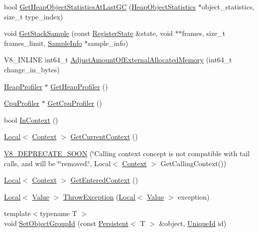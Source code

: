 \begin{DoxyCompactItemize}
\item 
bool \hyperlink{classv8_1_1_isolate_a677681d4c3abfc1bc2e8b50c23623e24}{Get\+Heap\+Object\+Statistics\+At\+Last\+GC} (\hyperlink{classv8_1_1_heap_object_statistics}{Heap\+Object\+Statistics} $\ast$object\+\_\+statistics, size\+\_\+t type\+\_\+index)
\item 
void \hyperlink{classv8_1_1_isolate_a8b173b48a477267ccd6c7d17c492b82e}{Get\+Stack\+Sample} (const \hyperlink{structv8_1_1_register_state}{Register\+State} \&state, void $\ast$$\ast$frames, size\+\_\+t frames\+\_\+limit, \hyperlink{structv8_1_1_sample_info}{Sample\+Info} $\ast$sample\+\_\+info)
\item 
V8\+\_\+\+I\+N\+L\+I\+NE int64\+\_\+t \hyperlink{classv8_1_1_isolate_aaeda5fa60961a3d9d476c46200e30711}{Adjust\+Amount\+Of\+External\+Allocated\+Memory} (int64\+\_\+t change\+\_\+in\+\_\+bytes)
\item 
\hyperlink{classv8_1_1_heap_profiler}{Heap\+Profiler} $\ast$ \hyperlink{classv8_1_1_isolate_a12f5bdacd2d2f62b1f5a22429a470ebb}{Get\+Heap\+Profiler} ()
\item 
\hyperlink{classv8_1_1_cpu_profiler}{Cpu\+Profiler} $\ast$ \hyperlink{classv8_1_1_isolate_a2e6874236fd37561b2263e011b1a714e}{Get\+Cpu\+Profiler} ()
\item 
bool \hyperlink{classv8_1_1_isolate_afb6bbd31a87d0999dbbe5402447690a9}{In\+Context} ()
\item 
\hyperlink{classv8_1_1_local}{Local}$<$ \hyperlink{classv8_1_1_context}{Context} $>$ \hyperlink{classv8_1_1_isolate_af68803b1b9fb0bf76107f56a7a762fac}{Get\+Current\+Context} ()
\item 
\hyperlink{classv8_1_1_isolate_adf1b08359e4162ee05caab23377dbc9d}{V8\+\_\+\+D\+E\+P\+R\+E\+C\+A\+T\+E\+\_\+\+S\+O\+ON} (\char`\"{}Calling context concept is not compatible with tail calls, and will be \char`\"{}\char`\"{}removed.\char`\"{}, Local$<$ \hyperlink{classv8_1_1_context}{Context} $>$ Get\+Calling\+Context())
\item 
\hyperlink{classv8_1_1_local}{Local}$<$ \hyperlink{classv8_1_1_context}{Context} $>$ \hyperlink{classv8_1_1_isolate_a05849e1b944a40051e063f799c79864c}{Get\+Entered\+Context} ()
\item 
\hyperlink{classv8_1_1_local}{Local}$<$ \hyperlink{classv8_1_1_value}{Value} $>$ \hyperlink{classv8_1_1_isolate_ad2d4dd42267c374a37b93df403ef11ac}{Throw\+Exception} (\hyperlink{classv8_1_1_local}{Local}$<$ \hyperlink{classv8_1_1_value}{Value} $>$ exception)
\item 
{\footnotesize template$<$typename T $>$ }\\void \hyperlink{classv8_1_1_isolate_ae4418cb238686a321aa406e90c72fab5}{Set\+Object\+Group\+Id} (const \hyperlink{classv8_1_1_persistent}{Persistent}$<$ T $>$ \&object, \hyperlink{classv8_1_1_unique_id}{Unique\+Id} id)
$$
\end{DoxyCompactItemize}
